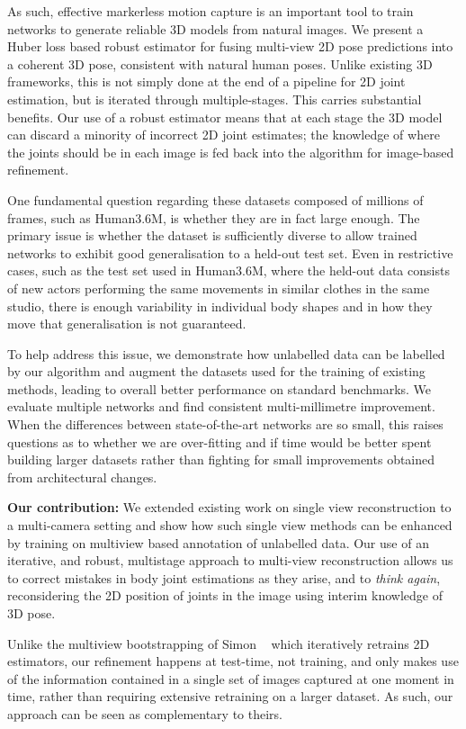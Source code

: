 \documentclass[10pt,twocolumn,letterpaper]{article}
\begin{document}
As such, effective markerless motion capture is an important tool to train
networks to generate reliable 3D models from natural images. We present a Huber
loss based robust
estimator for fusing multi-view 2D pose predictions into a coherent 3D pose,
consistent with natural human poses. Unlike existing 3D frameworks, this is not
simply done at the end of a pipeline for 2D joint estimation, but is iterated
through multiple-stages. This carries substantial benefits. Our use of a robust
estimator means that at each stage the 3D model can discard a minority of
incorrect 2D joint estimates; the knowledge of where the joints should
be in each image is fed back into the algorithm for image-based refinement.





One fundamental question regarding these datasets composed of millions of frames,
such as Human3.6M, is whether they are in fact large enough. The primary
issue is whether the dataset is sufficiently diverse to allow trained networks
to exhibit good generalisation to a held-out test set. Even in restrictive
cases, such as the test set used in Human3.6M, where the held-out data consists
of new actors performing the same movements in similar clothes in the same
studio, there is enough variability in individual body shapes and in how they
move that generalisation is not guaranteed.

To help address this issue, we demonstrate how unlabelled data can be
labelled by our algorithm and augment the datasets used for the
training of existing methods, leading to overall better performance on
standard benchmarks. We evaluate multiple networks and find consistent
multi-millimetre improvement.  When the differences between
state-of-the-art networks are so small, this raises questions as to
whether we are over-fitting and if time would be better spent building
larger datasets rather than fighting for small improvements obtained
from architectural changes.


{\textbf{Our contribution:} We extended existing work on single view
  reconstruction to a multi-camera setting and show how such single
  view methods can be enhanced by training on multiview based
  annotation of unlabelled data.  Our use of an iterative, and robust,
  multistage approach to multi-view reconstruction allows us to
  correct mistakes in body joint estimations as they arise, and to {\em
    think again}, reconsidering the 2D position of joints in the image
  using interim knowledge of 3D pose.
  
Unlike the multiview bootstrapping of Simon \etal~\cite{mvbootstrapping} which
  iteratively retrains 2D estimators, our refinement happens at test-time, not
  training, and only makes use of the information contained in a single set of
  images captured at one moment in time, rather than requiring extensive
  retraining on a larger dataset. As such, our approach can be seen as complementary
  to theirs.
}
\end{document}
